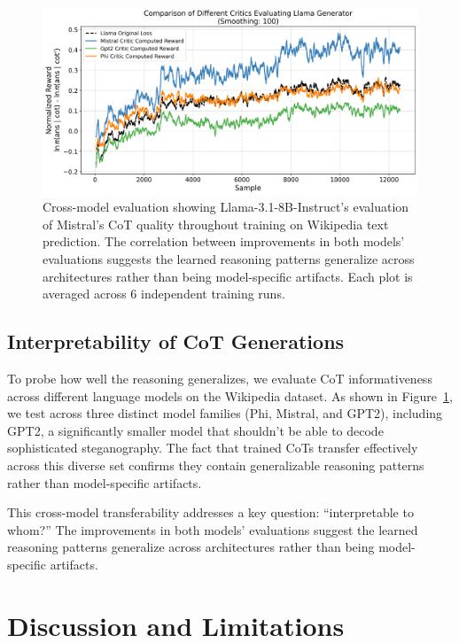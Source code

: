 \documentclass[letterpaper]{article} %
\begin{document}
\begin{figure}[ht]
  \centering
  \includegraphics[width=.9\textwidth]{Figures/wiki_multi_critic_comparison.png}
  \caption{Cross-model evaluation showing Llama-3.1-8B-Instruct's evaluation of Mistral's CoT quality throughout training on Wikipedia text prediction. The correlation between improvements in both models' evaluations suggests the learned reasoning patterns generalize across architectures rather than being model-specific artifacts. Each plot is averaged across 6 independent training runs.}
  \label{fig:cross-eval}
\end{figure}

\subsection{Interpretability of CoT Generations}
\label{subsec:interp}

To probe how well the reasoning generalizes, we evaluate CoT informativeness across different language models on the Wikipedia dataset. As shown in Figure~\ref{fig:cross-eval}, we test across three distinct model families (Phi, Mistral, and GPT2), including GPT2, a significantly smaller model that shouldn't be able to decode sophisticated steganography. The fact that trained CoTs transfer effectively across this diverse set confirms they contain generalizable reasoning patterns rather than model-specific artifacts.

This cross-model transferability addresses a key question: ``interpretable to whom?'' The improvements in both models' evaluations suggest the learned reasoning patterns generalize across architectures rather than being model-specific artifacts.

\section{Discussion and Limitations}
\label{sec:disc}
\end{document}
